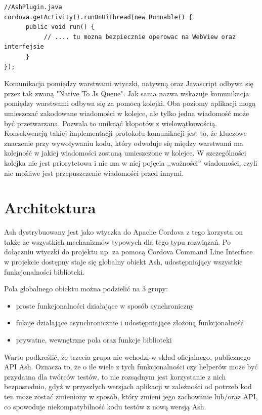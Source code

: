 \documentclass[brudnopis]{xmgr}
\begin{document}
\begin{lstlisting}
//AshPlugin.java
cordova.getActivity().runOnUiThread(new Runnable() {
      public void run() {
           // .... tu mozna bezpiecznie operowac na WebView oraz interfejsie
      }
});
\end{lstlisting}

Komunikacja pomiędzy warstwami wtyczki, natywną oraz Javascript odbywa się przez tak zwaną "Native To Js Queue". Jak sama nazwa wskazuje komunikacja pomiędzy warstwami odbywa się za pomocą kolejki. Oba poziomy aplikacji mogą umieszczać zakodowane wiadomości w kolejce, ale tylko jedna wiadomość może być przetwarzana. Pozwala to uniknąć kłopotów z wielowątkowością. Konsekwencją takiej implementacji protokołu komunikacji jest to, że kluczowe znaczenie przy wywoływaniu kodu, który odwołuje się między warstwami ma kolejność w jakiej wiadomości zostaną umieszczone w kolejce. W szczególności kolejka nie jest priorytetowa i nie ma w niej pojęcia ,,ważności'' wiadomości, czyli nie możliwe jest przepuszczenie wiadomości przed innymi.

\chapter{Architektura}

Ash dystrybuowany jest jako wtyczka do Apache Cordova z tego korzysta on także ze wszystkich mechanizmów typowych dla tego typu rozwiązań. Po dołączniu wtyczki do projektu np. za pomocą Cordova Command Line Interface w projekcie dostępny staje się globalny obiekt Ash, udostępniający wszystkie funkcjonalności biblioteki. 

Pola globalnego obiektu można podzielić na 3 grupy:  
\begin{itemize}
  \item proste funkcjonalności działające w sposób synchroniczny
  \item fukcje działające asynchronicznie i udostępniające złożoną funkcjonalność 
  \item prywatne, wewnętrzne pola oraz funkcje biblioteki
\end{itemize}
Warto podkreślić, że trzecia grupa nie wchodzi w skład oficjalnego, publicznego API Ash. Oznacza to, że o ile wiele z tych funkcjonalności czy helperów może być przydatna dla twórców testów, to nie rozsądnym jest korzystanie z nich bezposrednio, gdyż w przyszłych wersjach aplikacji w zależności od potrzeb kod ten może zostać zmieniony w sposób, który zmieni jego zachowanie lub/oraz API, co spowoduje niekompatybilność kodu testów z nową wersją Ash.
\end{document}
